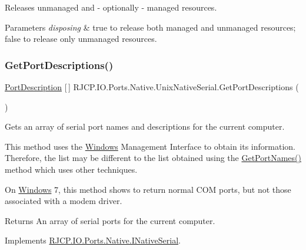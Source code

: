 Releases unmanaged and -\/ optionally -\/ managed resources. 


\begin{DoxyParams}{Parameters}
{\em disposing} & {\ttfamily true} to release both managed and unmanaged resources; {\ttfamily false} to release only unmanaged resources.\\
\hline
\end{DoxyParams}
\mbox{\label{class_r_j_c_p_1_1_i_o_1_1_ports_1_1_native_1_1_unix_native_serial_a7af4a784edae4f0bb517e2cfaa4de348}} 
\subsubsection{\texorpdfstring{GetPortDescriptions()}{GetPortDescriptions()}}
{\footnotesize\ttfamily \mbox{\hyperlink{class_r_j_c_p_1_1_i_o_1_1_ports_1_1_port_description}{Port\+Description}} \mbox{[}$\,$\mbox{]} R\+J\+C\+P.\+I\+O.\+Ports.\+Native.\+Unix\+Native\+Serial.\+Get\+Port\+Descriptions (\begin{DoxyParamCaption}{ }\end{DoxyParamCaption})}



Gets an array of serial port names and descriptions for the current computer. 

This method uses the \mbox{\hyperlink{namespace_r_j_c_p_1_1_i_o_1_1_ports_1_1_native_1_1_windows}{Windows}} Management Interface to obtain its information. Therefore, the list may be different to the list obtained using the \mbox{\hyperlink{class_r_j_c_p_1_1_i_o_1_1_ports_1_1_native_1_1_unix_native_serial_a2d9ec0ba3ee965ceea81ba5268f6621b}{Get\+Port\+Names()}} method which uses other techniques. 

On \mbox{\hyperlink{namespace_r_j_c_p_1_1_i_o_1_1_ports_1_1_native_1_1_windows}{Windows}} 7, this method shows to return normal C\+OM ports, but not those associated with a modem driver.

\begin{DoxyReturn}{Returns}
An array of serial ports for the current computer.
\end{DoxyReturn}


Implements \mbox{\hyperlink{interface_r_j_c_p_1_1_i_o_1_1_ports_1_1_native_1_1_i_native_serial_a7921194ade6a62e4b373cf8faec01c3f}{R\+J\+C\+P.\+I\+O.\+Ports.\+Native.\+I\+Native\+Serial}}.

